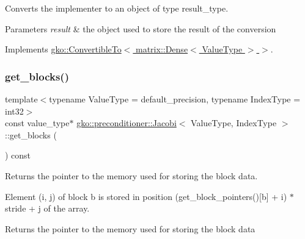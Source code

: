 Converts the implementer to an object of type result\+\_\+type. 


\begin{DoxyParams}{Parameters}
{\em result} & the object used to store the result of the conversion \\
\hline
\end{DoxyParams}


Implements \hyperlink{classgko_1_1ConvertibleTo_aa7f3420babcbed39ee15bc020bed4f7e}{gko\+::\+Convertible\+To$<$ matrix\+::\+Dense$<$ Value\+Type $>$ $>$}.

\mbox{\label{classgko_1_1preconditioner_1_1Jacobi_a1f3104ff10b00ff5faaf17a164400663}} 
\subsubsection{\texorpdfstring{get\+\_\+blocks()}{get\_blocks()}}
{\footnotesize\ttfamily template$<$typename Value\+Type  = default\+\_\+precision, typename Index\+Type  = int32$>$ \\
const value\+\_\+type$\ast$ \hyperlink{classgko_1_1preconditioner_1_1Jacobi}{gko\+::preconditioner\+::\+Jacobi}$<$ Value\+Type, Index\+Type $>$\+::get\+\_\+blocks (\begin{DoxyParamCaption}{ }\end{DoxyParamCaption}) const\hspace{0.3cm}{\ttfamily [noexcept]}}



Returns the pointer to the memory used for storing the block data. 

Element ({\ttfamily i}, {\ttfamily j}) of block {\ttfamily b} is stored in position {\ttfamily (get\+\_\+block\+\_\+pointers()\mbox{[}b\mbox{]} + i) $\ast$ stride + j} of the array.

\begin{DoxyReturn}{Returns}
the pointer to the memory used for storing the block data 
\end{DoxyReturn}
\mbox{\label{classgko_1_1preconditioner_1_1Jacobi_ad4cef85a520076fefc0e911ab205cf12}} 
